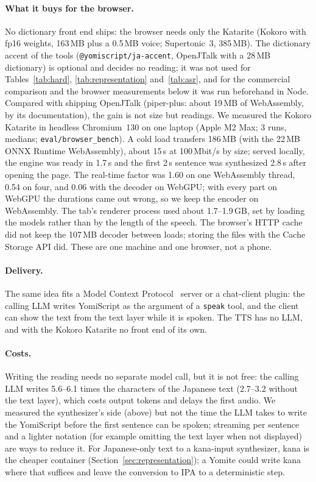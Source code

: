\documentclass[11pt,a4paper]{article}
\begin{document}
\paragraph{What it buys for the browser.} No dictionary front end ships: the browser needs only the Katarite
(Kokoro with fp16 weights, 163\,MB plus a 0.5\,MB voice; Supertonic~3, 385\,MB). The dictionary accent of the tools
(\texttt{@yomiscript/ja-accent}, OpenJTalk with a 28\,MB dictionary) is optional and decides no reading; it was not
used for Tables~\ref{tab:hard}, \ref{tab:representation} and~\ref{tab:asr}, and for the commercial comparison and the
browser measurements below it was run beforehand in Node. Compared with shipping OpenJTalk
(piper-plus: about 19\,MB of WebAssembly, by its documentation), the gain is not size but readings. We measured the
Kokoro Katarite in headless Chromium~130 on one laptop (Apple M2 Max; 3 runs, medians; \texttt{eval/browser\_bench}).
A cold load transfers 186\,MB (with the 22\,MB ONNX Runtime WebAssembly), about 15\,s at 100\,Mbit/s by size; served
locally, the engine was ready in 1.7\,s and the first 2\,s sentence was synthesized 2.8\,s after opening the page.
The real-time factor was 1.60 on one WebAssembly thread, 0.54 on four, and 0.06 with the decoder on WebGPU; with every
part on WebGPU the durations came out wrong, so we keep the encoder on WebAssembly. The tab's renderer process
used about 1.7--1.9\,GB, set by loading the models rather than by the length of the speech. The browser's HTTP cache did
not keep the 107\,MB decoder between loads; storing the files with the Cache Storage API did. These are one machine
and one browser, not a phone.

\paragraph{Delivery.} The same idea fits a Model Context Protocol~\citep{mcp} server or a chat-client plugin: the
calling LLM writes YomiScript as the argument of a \texttt{speak} tool, and the client can show the text from the text
layer while it is spoken. The TTS has no LLM, and with the Kokoro Katarite no front end of its own.

\paragraph{Costs.} Writing the reading needs no separate model call, but it is not free: the calling LLM writes
5.6--6.1 times the characters of the Japanese text (2.7--3.2 without the text layer), which costs output tokens and
delays the first audio. We measured the synthesizer's side (above) but not the time the LLM takes to write the
YomiScript before the first sentence can be spoken; streaming per sentence and a lighter
notation (for example omitting the text layer when not displayed) are ways to reduce it. For Japanese-only text to a
kana-input synthesizer, kana is the cheaper container (Section~\ref{sec:representation}); a Yomite could write kana
where that suffices and leave the conversion to IPA to a deterministic step.
\end{document}
